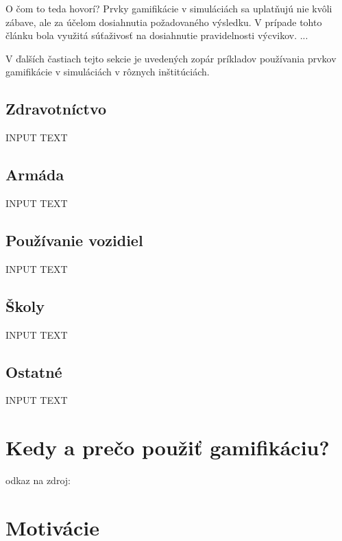 \documentclass[10pt,slovak,a4paper]{article}
\begin{document}
O čom to teda hovorí? Prvky gamifikácie v simuláciách sa uplatňujú nie kvôli zábave, ale za účelom dosiahnutia požadovaného výsledku. V prípade tohto článku bola využitá súťaživosť na dosiahnutie pravidelnosti výcvikov. ...

V ďalších častiach tejto sekcie je uvedených zopár príkladov používania prvkov gamifikácie v simuláciách v rôznych inštitúciách.

\clearpage

\subsection{Zdravotníctvo} \label{healthcare}

INPUT TEXT

\subsection{Armáda} \label{army}

INPUT TEXT

\subsection{Používanie vozidiel} \label{vehicle}

INPUT TEXT

\subsection{Školy} \label{school}

INPUT TEXT

\subsection{Ostatné} \label{other}

INPUT TEXT

\section{Kedy a prečo použiť gamifikáciu?} \label{Reason}

odkaz na zdroj: \cite{Pantelidis}

\section{Motivácie} \label{Motivation}
\end{document}
